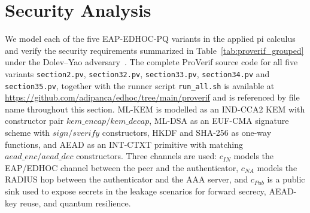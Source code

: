 \documentclass{easychair}
\begin{document}
\section{Security Analysis}
\label{security-analysis}
We model each of the five EAP-EDHOC-PQ variants in the applied pi
calculus~\cite{blanchet2001proverif,blanchet2016automated} and verify the
security requirements summarized in Table~\ref{tab:proverif_grouped}
under the Dolev--Yao
adversary~\cite{dolev1983security,cremers2017symbolic}. The complete
ProVerif source code for all five variants
\texttt{section2.pv}, \texttt{section32.pv}, \texttt{section33.pv},
\texttt{section34.pv} and \texttt{section35.pv}, together with the
runner script \texttt{run\_all.sh} is available at
\url{https://github.com/adipanca/edhoc/tree/main/proverif} and is
referenced by file name throughout this section. ML-KEM is modelled
as an IND-CCA2 KEM with constructor pair
$\mathit{kem\_encap}/\mathit{kem\_decap}$, ML-DSA as an EUF-CMA signature
scheme with $\mathit{sign}/\mathit{sverify}$ constructors, HKDF and
SHA-256 as one-way functions, and AEAD as an INT-CTXT primitive with
matching $\mathit{aead\_enc}/\mathit{aead\_dec}$ constructors.
Three channels are used: $c_{IN}$ models the EAP/EDHOC channel between
the peer and the authenticator, $c_{NA}$ models the RADIUS hop between
the authenticator and the AAA server, and $c_{Pub}$ is a public sink
used to expose secrets in the leakage scenarios for forward secrecy,
AEAD-key reuse, and quantum resilience.
\end{document}
